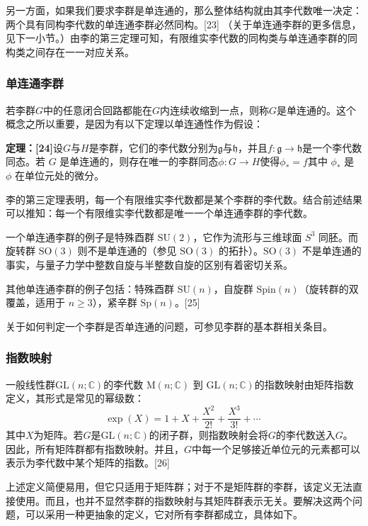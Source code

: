 另一方面，如果我们要求李群是单连通的，那么整体结构就由其李代数唯一决定：两个具有同构李代数的单连通李群必然同构。[23] （关于单连通李群的更多信息，见下一小节。）由李的第三定理可知，有限维实李代数的同构类与单连通李群的同构类之间存在一一对应关系。
\subsubsection{单连通李群}
若李群$G$中的任意闭合回路都能在$G$内连续收缩到一点，则称$G$是单连通的。这个概念之所以重要，是因为有以下定理以单连通性作为假设：

\textbf{定理：[24]}设$G$与$H$是李群，它们的李代数分别为$\mathfrak{g}$与$\mathfrak{h}$，并且$f : \mathfrak{g} \to \mathfrak{h}$是一个李代数同态。若 $G$ 是单连通的，则存在唯一的李群同态$\phi : G \to H$使得$\phi_{*} = f$其中 $\phi_{*}$ 是 $\phi$ 在单位元处的微分。

李的第三定理表明，每一个有限维实李代数都是某个李群的李代数。结合前述结果可以推知：每一个有限维实李代数都是唯一一个单连通李群的李代数。

一个单连通李群的例子是特殊酉群 $\mathrm{SU}(2)$，它作为流形与三维球面 $S^{3}$ 同胚。而旋转群 $\mathrm{SO}(3)$ 则不是单连通的（参见 $\mathrm{SO}(3)$ 的拓扑）。$\mathrm{SO}(3)$ 不是单连通的事实，与量子力学中整数自旋与半整数自旋的区别有着密切关系。

其他单连通李群的例子包括：特殊酉群 $\mathrm{SU}(n)$，自旋群 $\mathrm{Spin}(n)$（旋转群的双覆盖，适用于 $n \geq 3$），紧辛群 $\mathrm{Sp}(n)$。[25]

关于如何判定一个李群是否单连通的问题，可参见李群的基本群相关条目。
\subsubsection{指数映射}
一般线性群$\mathrm{GL}(n;\mathbb{C})$的李代数 $\mathrm{M}(n;\mathbb{C})$ 到 $\mathrm{GL}(n;\mathbb{C})$的指数映射由矩阵指数定义，其形式是常见的幂级数：
$$
\exp(X) = 1 + X + \frac{X^2}{2!} + \frac{X^3}{3!} + \cdots~
$$
其中$X$为矩阵。若$G$是$\mathrm{GL}(n;\mathbb{C})$的闭子群，则指数映射会将$G$的李代数送入$G$。因此，所有矩阵群都有指数映射。并且，$G$中每一个足够接近单位元的元素都可以表示为李代数中某个矩阵的指数。[26]

上述定义简便易用，但它只适用于矩阵群；对于不是矩阵群的李群，该定义无法直接使用。而且，也并不显然李群的指数映射与其矩阵群表示无关。要解决这两个问题，可以采用一种更抽象的定义，它对所有李群都成立，具体如下。

